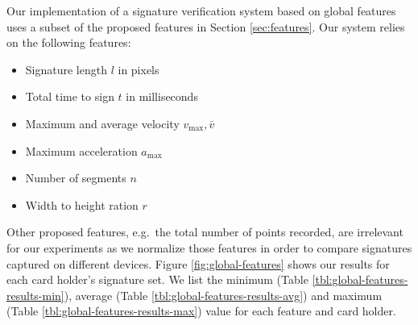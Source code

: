 \documentclass[a4paper, oneside]{csthesis}
\begin{document}
Our implementation of a signature verification system based on global features uses a subset of the proposed features in Section \ref{sec:features}. Our system relies on the following features:

\begin{itemize}
\item Signature length $l$ in pixels
\item Total time to sign  $t$ in milliseconds
\item Maximum and average velocity $v_\text{max}, \bar{v}$
\item Maximum acceleration $a_\text{max}$
\item Number of segments $n$
\item Width to height ration $r$
\end{itemize}

Other proposed features, e.g.\ the total number of points recorded, are irrelevant for our experiments as we normalize those features in order to compare signatures captured on different devices.
Figure \ref{fig:global-features} shows our results for each card holder's signature set. We list the minimum (Table \ref{tbl:global-features-results-min}), average (Table \ref{tbl:global-features-results-avg}) and maximum (Table \ref{tbl:global-features-results-max}) value for each feature and card holder.
\end{document}

